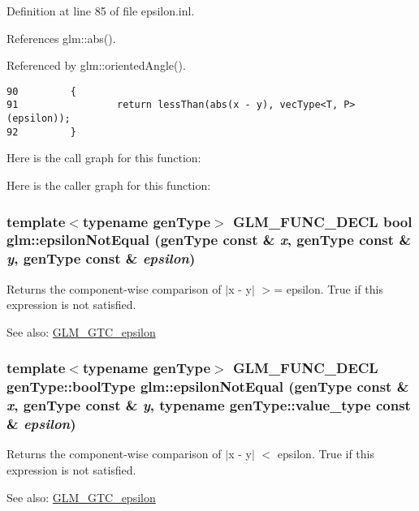Definition at line 85 of file epsilon.inl.

References glm::abs().

Referenced by glm::orientedAngle().

\begin{Code}\begin{verbatim}90         {
91                 return lessThan(abs(x - y), vecType<T, P>(epsilon));
92         }
\end{verbatim}
\end{Code}




Here is the call graph for this function:

Here is the caller graph for this function:\hypertarget{group__gtc__epsilon_gcdfcf5e1180e8147b0619c0743e3eb7d}{
\subsubsection[epsilonNotEqual]{\setlength{\rightskip}{0pt plus 5cm}template$<$typename genType$>$ GLM\_\-FUNC\_\-DECL bool glm::epsilonNotEqual (genType const \& {\em x}, \/  genType const \& {\em y}, \/  genType const \& {\em epsilon})}}
\label{group__gtc__epsilon_gcdfcf5e1180e8147b0619c0743e3eb7d}


Returns the component-wise comparison of $|$x - y$|$ $>$= epsilon. True if this expression is not satisfied.

\begin{Desc}
\item[See also:]\hyperlink{group__gtc__epsilon}{GLM\_\-GTC\_\-epsilon} \end{Desc}
\hypertarget{group__gtc__epsilon_g3958ccc0b5aa101c4b6eea41a2f2d51a}{
\subsubsection[epsilonNotEqual]{\setlength{\rightskip}{0pt plus 5cm}template$<$typename genType$>$ GLM\_\-FUNC\_\-DECL genType::boolType glm::epsilonNotEqual (genType const \& {\em x}, \/  genType const \& {\em y}, \/  typename genType::value\_\-type const \& {\em epsilon})}}
\label{group__gtc__epsilon_g3958ccc0b5aa101c4b6eea41a2f2d51a}


Returns the component-wise comparison of $|$x - y$|$ $<$ epsilon. True if this expression is not satisfied.

\begin{Desc}
\item[See also:]\hyperlink{group__gtc__epsilon}{GLM\_\-GTC\_\-epsilon} \end{Desc}

